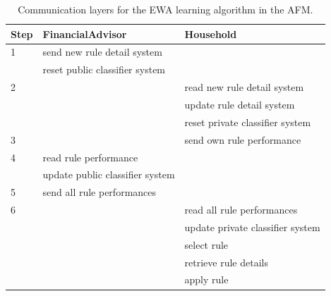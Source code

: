 \documentclass[a4paper,11pt]{article}
\begin{document}
\begin{table}
  \centering
  \begin{tabular}{|l|l|l|}
  \hline
  Step & FinancialAdvisor & Household \\
  \hline\hline
    1 & send new rule detail system &   \\
      & reset public classifier system &   \\
    \hline
    2 &                             & read new rule detail system \\
      &                             & update rule detail system \\
      &                             & reset private classifier system \\
    \hline
    3 &                             & send own rule performance \\
    \hline
    4 & read rule performance       &  \\
      & update public classifier system &   \\
    \hline
    5 & send all rule performances  &  \\  \hline
    6 &                             & read all rule performances \\
      &                             & update private classifier system \\
      &                             & select rule\\
      &                             & retrieve rule details\\
      &                             & apply rule\\      
  \hline
  \end{tabular}
  \caption{Communication layers for the EWA learning algorithm in the AFM.}
  \label{Table: messages}
\end{table}
\end{document}
